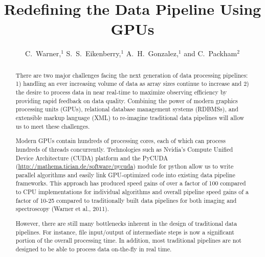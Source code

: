 
\resetcounters




\title{Redefining the Data Pipeline Using GPUs}
\author{C.~Warner,$^1$ S.~S.~Eikenberry,$^1$ A.~H.~Gonzalez,$^1$ and C.~Packham$^2$
}


\begin{abstract}
There are two major challenges facing the next generation of data processing pipelines: 1) handling an ever increasing volume of data as array sizes continue to increase and 2) the desire to process data in near real-time to maximize observing efficiency by providing rapid feedback on data quality.  Combining the power of modern graphics processing units (GPUs), relational database management systems (RDBMSs), and extensible markup language (XML) to re-imagine traditional data pipelines will allow us to meet these challenges.

Modern GPUs contain hundreds of processing cores, each of which can process hundreds of threads concurrently.  Technologies such as Nvidia's Compute Unified Device Architecture (CUDA) platform and the PyCUDA (\url{http://mathema.tician.de/software/pycuda}) module for python allow us to write parallel algorithms and easily link GPU-optimized code into existing data pipeline frameworks.  This approach has produced speed gains of over a factor of 100 compared to CPU implementations for individual algorithms and overall pipeline speed gains of a factor of 10-25 compared to traditionally built data pipelines for both imaging and spectroscopy (Warner et al., 2011).

However, there are still many bottlenecks inherent in the design of traditional data pipelines.  For instance, file input/output of intermediate steps is now a significant portion of the overall processing time.  In addition, most traditional pipelines are not designed to be able to process data on-the-fly in real time.


\end{abstract}
